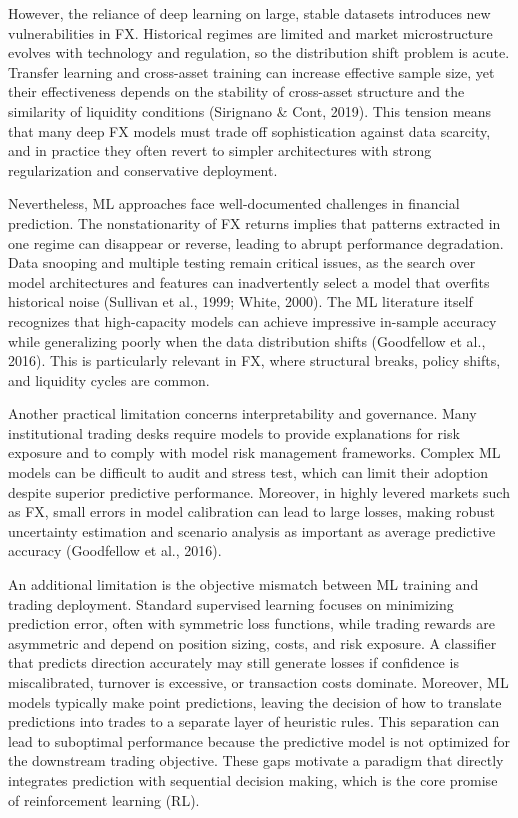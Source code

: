 \documentclass[12pt,a4paper]{article}
\begin{document}
However, the reliance of deep learning on large, stable datasets introduces new vulnerabilities in FX. Historical regimes are limited and market microstructure evolves with technology and regulation, so the distribution shift problem is acute. Transfer learning and cross-asset training can increase effective sample size, yet their effectiveness depends on the stability of cross-asset structure and the similarity of liquidity conditions (Sirignano \& Cont, 2019). This tension means that many deep FX models must trade off sophistication against data scarcity, and in practice they often revert to simpler architectures with strong regularization and conservative deployment.

Nevertheless, ML approaches face well-documented challenges in financial prediction. The nonstationarity of FX returns implies that patterns extracted in one regime can disappear or reverse, leading to abrupt performance degradation. Data snooping and multiple testing remain critical issues, as the search over model architectures and features can inadvertently select a model that overfits historical noise (Sullivan et al., 1999; White, 2000). The ML literature itself recognizes that high-capacity models can achieve impressive in-sample accuracy while generalizing poorly when the data distribution shifts (Goodfellow et al., 2016). This is particularly relevant in FX, where structural breaks, policy shifts, and liquidity cycles are common.

Another practical limitation concerns interpretability and governance. Many institutional trading desks require models to provide explanations for risk exposure and to comply with model risk management frameworks. Complex ML models can be difficult to audit and stress test, which can limit their adoption despite superior predictive performance. Moreover, in highly levered markets such as FX, small errors in model calibration can lead to large losses, making robust uncertainty estimation and scenario analysis as important as average predictive accuracy (Goodfellow et al., 2016).

An additional limitation is the objective mismatch between ML training and trading deployment. Standard supervised learning focuses on minimizing prediction error, often with symmetric loss functions, while trading rewards are asymmetric and depend on position sizing, costs, and risk exposure. A classifier that predicts direction accurately may still generate losses if confidence is miscalibrated, turnover is excessive, or transaction costs dominate. Moreover, ML models typically make point predictions, leaving the decision of how to translate predictions into trades to a separate layer of heuristic rules. This separation can lead to suboptimal performance because the predictive model is not optimized for the downstream trading objective. These gaps motivate a paradigm that directly integrates prediction with sequential decision making, which is the core promise of reinforcement learning (RL).
\end{document}
